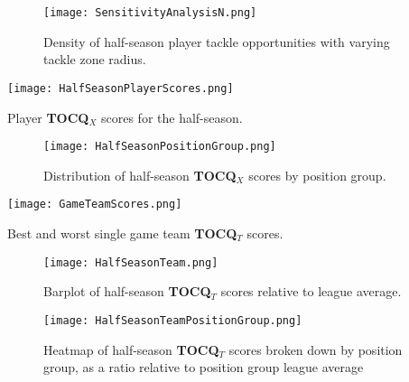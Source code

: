 \documentclass{article}
\begin{document}
\begin{figure}[H]
    \centering
    \texttt{[image: SensitivityAnalysisN.png]}
    \caption{Density of half-season player tackle opportunities with varying tackle zone radius.}
    \label{fig:SensitivityAnalysisN}
\end{figure}

\begin{table}[H]
    \centering
    \texttt{[image: HalfSeasonPlayerScores.png]}
    \caption{Player \textbf{TOCQ$_X$} scores for the half-season.}
    \label{table:HalfSeasonPlayer}
\end{table}

\begin{figure}[H]
    \centering
    \texttt{[image: HalfSeasonPositionGroup.png]}
    \caption{Distribution of half-season \textbf{TOCQ$_X$} scores by position group.}
    \label{fig:HalfSeasonPositionGroup}
\end{figure}

\begin{table}[H]
    \centering
    \texttt{[image: GameTeamScores.png]}
    \caption{Best and worst single game team \textbf{TOCQ$_T$} scores.}
    \label{table:GameTeamScores}
\end{table}

\begin{figure}[H]
    \centering
    \texttt{[image: HalfSeasonTeam.png]}
    \caption{Barplot of half-season \textbf{TOCQ$_T$} scores relative to league average.}
    \label{fig:HalfSeasonTeam}
\end{figure}

\begin{figure}[H]
    \centering
    \texttt{[image: HalfSeasonTeamPositionGroup.png]}
    \caption{Heatmap of half-season \textbf{TOCQ$_T$} scores broken down by position group, as a ratio relative to position group league average}
    \label{fig:HalfSeasonTeamPosGroup}
\end{figure}
\end{document}

